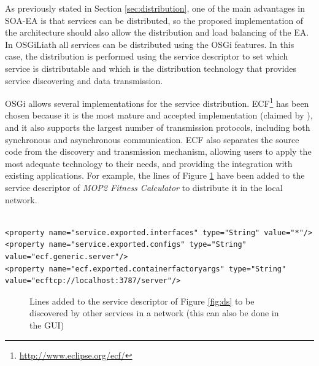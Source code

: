 As previously stated in Section \ref{sec:distribution}, one of the main advantages in SOA-EA is that services can be distributed, so the proposed implementation of the architecture  should also allow  the distribution and load balancing of the EA. In OSGiLiath all services can be distributed using the OSGi features. In this case, the distribution is performed using the service descriptor to set which service is distributable and which is the distribution technology that provides service discovering and data transmission.

OSGi allows several implementations for the service distribution. ECF\footnote{\url{http://www.eclipse.org/ecf/}} has been chosen because it is the most mature and accepted implementation (claimed by  \cite{petzold2011dynamic}), and it also supports the largest number of transmission protocols, including both synchronous and asynchronous communication. ECF also separates the source code from the discovery and transmission mechanism, allowing users to apply the most adequate technology to their needs, and providing the integration with existing applications. For example, the lines of Figure \ref{fig:remote} have been added to the service descriptor of {\em MOP2 Fitness Calculator} to distribute it in the local network.




\newsavebox{\mintedboxServer}
\begin{lrbox}{\mintedboxServer}
\begin{minipage}{10cm}
\begin{verbatim}

<property name="service.exported.interfaces" type="String" value="*"/>
<property name="service.exported.configs" type="String" 
value="ecf.generic.server"/>
<property name="ecf.exported.containerfactoryargs" type="String" 
value="ecftcp://localhost:3787/server"/>
\end{verbatim}
\end{minipage}
\end{lrbox}

\begin{figure}
\usebox{\mintedboxServer}
\caption{Lines added to the service descriptor of Figure \ref{fig:ds} to be discovered by other services in a network  (this can also be done in the GUI)} 
\label{fig:remote} 
\end{figure}

